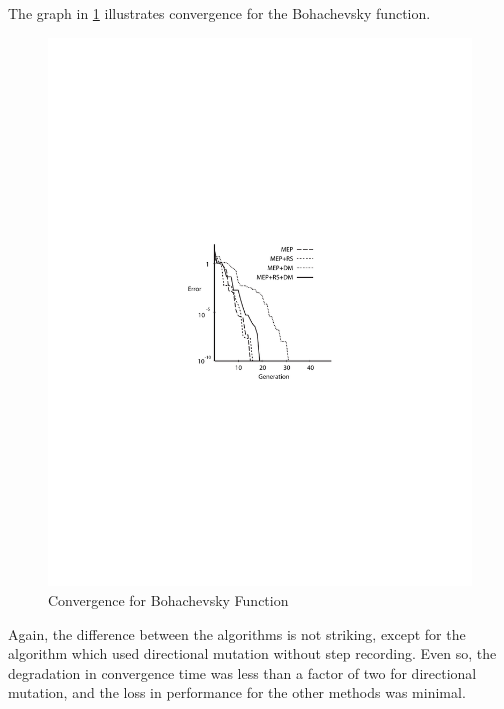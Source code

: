 \documentclass[12pt, titlepage]{article}
\begin{document}
The graph in \ref{fig:f2} illustrates convergence for the Bohachevsky function.
\begin{figure}
\centerline{\includegraphics{fig2}}
\caption{Convergence for Bohachevsky Function}\label{fig:f2}
\end{figure}
Again, the difference between the algorithms is not striking, except
for the algorithm which used directional mutation without step
recording.  Even so, the degradation in convergence time was less than
a factor of two for directional mutation, and the loss in performance
for the other methods was minimal.
\end{document}
